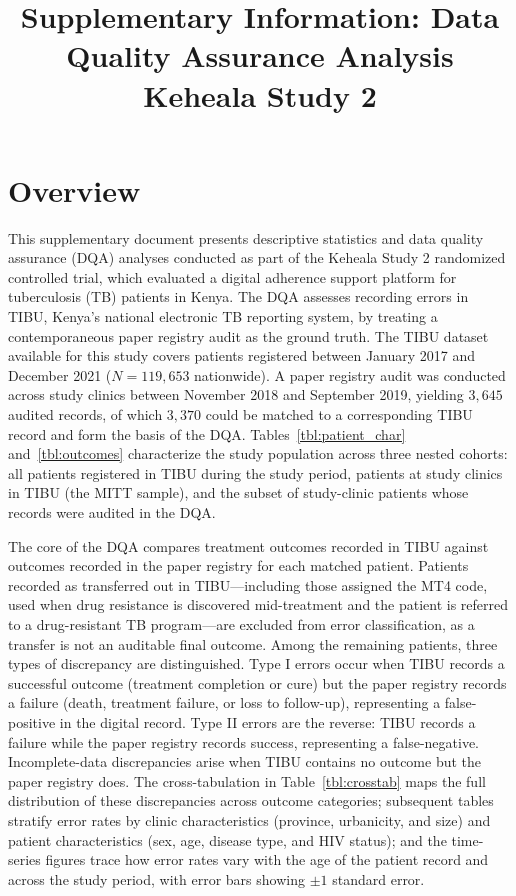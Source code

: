 \documentclass[12pt]{article}
\title{Supplementary Information: Data Quality Assurance Analysis\\
\large Keheala Study 2}
\date{}
\begin{document}
\maketitle
\tableofcontents
\newpage

\section*{Overview}

This supplementary document presents descriptive statistics and data quality assurance (DQA) analyses conducted as part of the Keheala Study 2 randomized controlled trial, which evaluated a digital adherence support platform for tuberculosis (TB) patients in Kenya. The DQA assesses recording errors in TIBU, Kenya's national electronic TB reporting system, by treating a contemporaneous paper registry audit as the ground truth. The TIBU dataset available for this study covers patients registered between January 2017 and December 2021 ($N = 119{,}653$ nationwide). A paper registry audit was conducted across study clinics between November 2018 and September 2019, yielding $3{,}645$ audited records, of which $3{,}370$ could be matched to a corresponding TIBU record and form the basis of the DQA. Tables~\ref{tbl:patient_char} and~\ref{tbl:outcomes} characterize the study population across three nested cohorts: all patients registered in TIBU during the study period, patients at study clinics in TIBU (the MITT sample), and the subset of study-clinic patients whose records were audited in the DQA.

The core of the DQA compares treatment outcomes recorded in TIBU against outcomes recorded in the paper registry for each matched patient. Patients recorded as transferred out in TIBU---including those assigned the MT4 code, used when drug resistance is discovered mid-treatment and the patient is referred to a drug-resistant TB program---are excluded from error classification, as a transfer is not an auditable final outcome. Among the remaining patients, three types of discrepancy are distinguished. Type I errors occur when TIBU records a successful outcome (treatment completion or cure) but the paper registry records a failure (death, treatment failure, or loss to follow-up), representing a false-positive in the digital record. Type II errors are the reverse: TIBU records a failure while the paper registry records success, representing a false-negative. Incomplete-data discrepancies arise when TIBU contains no outcome but the paper registry does. The cross-tabulation in Table~\ref{tbl:crosstab} maps the full distribution of these discrepancies across outcome categories; subsequent tables stratify error rates by clinic characteristics (province, urbanicity, and size) and patient characteristics (sex, age, disease type, and HIV status); and the time-series figures trace how error rates vary with the age of the patient record and across the study period, with error bars showing $\pm 1$ standard error.
\end{document}

